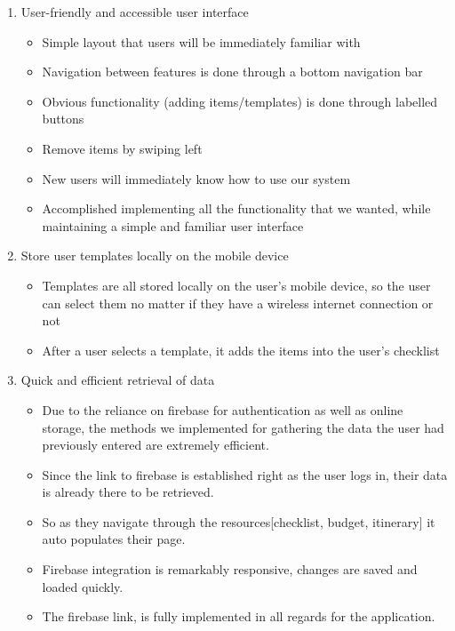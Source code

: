 \documentclass[12pt]{article}
\begin{document}
	\begin{enumerate}
		\item{User-friendly and accessible user interface}
			\begin{itemize}
				\item Simple layout that users will be immediately familiar with
				\item Navigation between features is done through a bottom navigation bar
				\item Obvious functionality (adding items/templates) is done through labelled buttons
				\item Remove items by swiping left
				\item New users will immediately know how to use our system
				\item Accomplished implementing all the functionality that we wanted, while maintaining a simple and familiar user interface
			\end{itemize}

		\item{Store user templates locally on the mobile device}
		\begin{itemize}
			\item Templates are all stored locally on the user's mobile device, so the user can select them no matter if they have a wireless internet connection or not
			\item After a user selects a template, it adds the items into the user's checklist
		\end{itemize}

		\item{Quick and efficient retrieval of data}
			\begin{itemize}
			\item  Due to the reliance on firebase for authentication as well as online storage, the methods we implemented for gathering the data the user had previously entered
			are extremely efficient.
			\item Since the link to firebase is established right as the user logs in, their data is already there to be retrieved.
			\item So as they navigate through the resources[checklist, budget, itinerary] it auto populates their page.
			\item Firebase integration is remarkably responsive, changes are saved and loaded quickly.
			\item The firebase link, is fully implemented in all regards for the application.
			\end{itemize}
	\end{enumerate}

	\pagebreak
\end{document}
